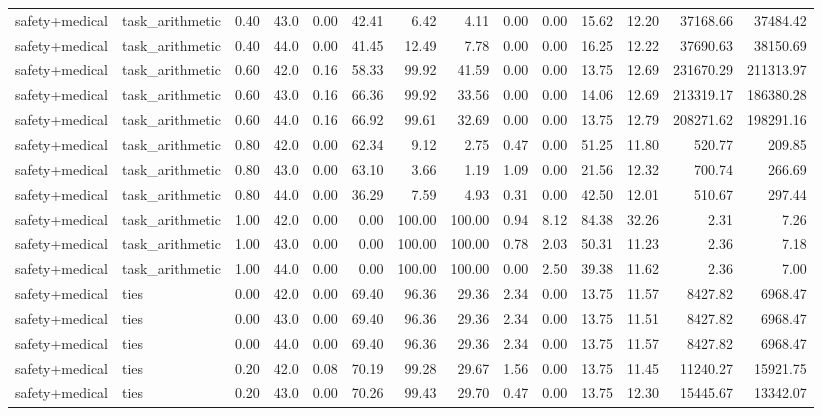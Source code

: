 \documentclass{article}
\begin{document}
\begin{table}[H]
{\begin{tabular}{llllrrrrrrrrrr}
safety+medical & task\_arithmetic & 0.40 & 43.0 & 0.00 & 42.41 & 6.42 & 4.11 & 0.00 & 0.00 & 15.62 & 12.20 & 37168.66 & 37484.42 \\
safety+medical & task\_arithmetic & 0.40 & 44.0 & 0.00 & 41.45 & 12.49 & 7.78 & 0.00 & 0.00 & 16.25 & 12.22 & 37690.63 & 38150.69 \\
safety+medical & task\_arithmetic & 0.60 & 42.0 & 0.16 & 58.33 & 99.92 & 41.59 & 0.00 & 0.00 & 13.75 & 12.69 & 231670.29 & 211313.97 \\
safety+medical & task\_arithmetic & 0.60 & 43.0 & 0.16 & 66.36 & 99.92 & 33.56 & 0.00 & 0.00 & 14.06 & 12.69 & 213319.17 & 186380.28 \\
safety+medical & task\_arithmetic & 0.60 & 44.0 & 0.16 & 66.92 & 99.61 & 32.69 & 0.00 & 0.00 & 13.75 & 12.79 & 208271.62 & 198291.16 \\
safety+medical & task\_arithmetic & 0.80 & 42.0 & 0.00 & 62.34 & 9.12 & 2.75 & 0.47 & 0.00 & 51.25 & 11.80 & 520.77 & 209.85 \\
safety+medical & task\_arithmetic & 0.80 & 43.0 & 0.00 & 63.10 & 3.66 & 1.19 & 1.09 & 0.00 & 21.56 & 12.32 & 700.74 & 266.69 \\
safety+medical & task\_arithmetic & 0.80 & 44.0 & 0.00 & 36.29 & 7.59 & 4.93 & 0.31 & 0.00 & 42.50 & 12.01 & 510.67 & 297.44 \\
safety+medical & task\_arithmetic & 1.00 & 42.0 & 0.00 & 0.00 & 100.00 & 100.00 & 0.94 & 8.12 & 84.38 & 32.26 & 2.31 & 7.26 \\
safety+medical & task\_arithmetic & 1.00 & 43.0 & 0.00 & 0.00 & 100.00 & 100.00 & 0.78 & 2.03 & 50.31 & 11.23 & 2.36 & 7.18 \\
safety+medical & task\_arithmetic & 1.00 & 44.0 & 0.00 & 0.00 & 100.00 & 100.00 & 0.00 & 2.50 & 39.38 & 11.62 & 2.36 & 7.00 \\
safety+medical & ties & 0.00 & 42.0 & 0.00 & 69.40 & 96.36 & 29.36 & 2.34 & 0.00 & 13.75 & 11.57 & 8427.82 & 6968.47 \\
safety+medical & ties & 0.00 & 43.0 & 0.00 & 69.40 & 96.36 & 29.36 & 2.34 & 0.00 & 13.75 & 11.51 & 8427.82 & 6968.47 \\
safety+medical & ties & 0.00 & 44.0 & 0.00 & 69.40 & 96.36 & 29.36 & 2.34 & 0.00 & 13.75 & 11.57 & 8427.82 & 6968.47 \\
safety+medical & ties & 0.20 & 42.0 & 0.08 & 70.19 & 99.28 & 29.67 & 1.56 & 0.00 & 13.75 & 11.45 & 11240.27 & 15921.75 \\
safety+medical & ties & 0.20 & 43.0 & 0.00 & 70.26 & 99.43 & 29.70 & 0.47 & 0.00 & 13.75 & 12.30 & 15445.67 & 13342.07 \\

\end{tabular}}
\end{table}
\end{document}
